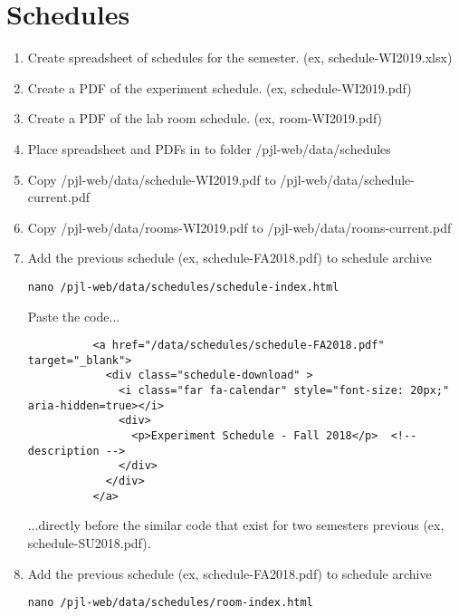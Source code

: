 \documentclass[justified]{pjlProcessDocs}
\begin{document}
\section{Schedules}\label{sec:schedule}

\begin{enumerate}

\item Create spreadsheet of schedules for the semester. (ex, schedule-WI2019.xlsx)

\item Create a PDF of the experiment schedule. (ex, schedule-WI2019.pdf)

\item Create a PDF of the lab room schedule. (ex, room-WI2019.pdf)

\item Place spreadsheet and PDFs in to folder /pjl-web/data/schedules

\item Copy /pjl-web/data/schedule-WI2019.pdf to /pjl-web/data/schedule-current.pdf

\item Copy /pjl-web/data/rooms-WI2019.pdf to /pjl-web/data/rooms-current.pdf

\item Add the previous schedule (ex, schedule-FA2018.pdf) to schedule archive

\begin{lstlisting}
nano /pjl-web/data/schedules/schedule-index.html       
\end{lstlisting}

Paste the code...
\begin{lstlisting}
          <a href="/data/schedules/schedule-FA2018.pdf" target="_blank">
            <div class="schedule-download" >
              <i class="far fa-calendar" style="font-size: 20px;" aria-hidden=true></i> 
              <div>
                <p>Experiment Schedule - Fall 2018</p>  <!-- description -->
              </div>
            </div>
          </a>
\end{lstlisting}

...directly before the similar code that exist for two semesters previous (ex, schedule-SU2018.pdf).

\item Add the previous schedule (ex, schedule-FA2018.pdf) to schedule archive

\begin{lstlisting}
nano /pjl-web/data/schedules/room-index.html       
\end{lstlisting}


\end{enumerate}
\end{document}
